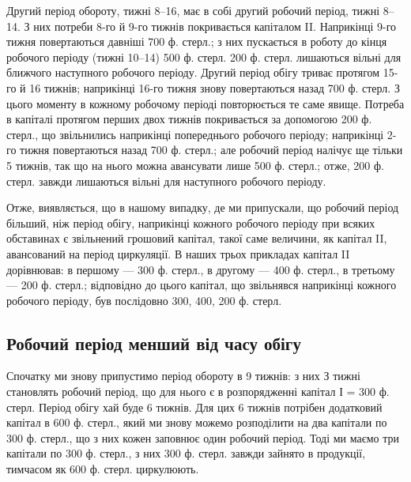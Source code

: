 Другий період обороту, тижні 8--16, має в собі другий робочий
період, тижні 8--14. З них потреби 8-го й 9-го тижнів покривається
капіталом II. Наприкінці 9-го тижня повертаються давніші 700 ф. стерл.;
з них пускається в роботу до кінця робочого періоду (тижні 10--14)
500 ф. стерл. 200 ф. стерл. лишаються вільні для ближчого наступного
робочого періоду. Другий період обігу триває протягом 15-го й 16 тижнів;
наприкінці 16-го тижня знову повертаються назад 700 ф. стерл.
З цього моменту в кожному робочому періоді повторюється те саме
явище. Потреба в капіталі протягом перших двох тижнів покривається
за допомогою 200 ф. стерл., що звільнились наприкінці попереднього
робочого періоду; наприкінці 2-го тижня повертаються назад 700 ф.
стерл.; але робочий період налічує ще тільки 5 тижнів, так що на нього
можна авансувати лише 500 ф. стерл.; отже, 200 ф. стерл. завжди лишаються
вільні для наступного робочого періоду.

Отже, виявляється, що в нашому випадку, де ми припускали, що робочий
період більший, ніж період обігу, наприкінці кожного робочого
періоду при всяких обставинах є звільнений грошовий капітал, такої
саме величини, як капітал II, авансований на період циркуляції. В наших
трьох прикладах капітал II дорівнював: в першому — 300 ф. стерл., в
другому — 400 ф. стерл., в третьому — 200 ф. стерл.; відповідно до
цього капітал, що звільнявся наприкінці кожного робочого періоду, був
послідовно 300, 400, 200 ф. стерл.

\subsection{Робочий період менший від часу обігу}

Спочатку ми знову припустимо період обороту в 9 тижнів: з них
З тижні становлять робочий період, що для нього є в розпорядженні
капітал  І = 300 ф. стерл. Період обігу хай буде 6 тижнів. Для цих
6 тижнів потрібен додатковий капітал в 600 ф. стерл., який ми знову
можемо розподілити на два капітали по 300 ф. стерл., що з них кожен
заповнює один робочий період. Тоді ми маємо три капітали по 300 ф.
стерл., з них 300 ф. стерл. завжди зайнято в продукції, тимчасом як
600 ф. стерл. циркулюють.

